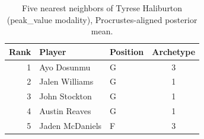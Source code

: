 \begin{table}[htbp]
  \centering\small
  \begin{tabular}{rllc}
    \toprule
    Rank & Player & Position & Archetype \\
    \midrule
    1 & Ayo Dosunmu & G & 3 \\
    2 & Jalen Williams & G & 1 \\
    3 & John Stockton & G & 1 \\
    4 & Austin Reaves & G & 1 \\
    5 & Jaden McDaniels & F & 3 \\
    \bottomrule
  \end{tabular}
  \caption{Five nearest neighbors of Tyrese Haliburton (peak_value modality), Procrustes-aligned posterior mean.}
  \label{tab:Tyrese_Haliburton_neighbors_peak_value}
\end{table}

